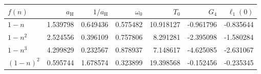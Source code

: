 \begin{tabular}{lrrrrrr}
\toprule
$f(n)$ & $a_{\mathrm{H}}$ & $1/a_{\mathrm{H}}$ & $\omega_0$ & $T_0$ & $G_4$ & $\ell_1(0)$ \\
\midrule
$1-n$ & 1.539798 & 0.649436 & 0.575482 & 10.918127 & -0.961796 & -0.835644 \\
$1-n^2$ & 2.524556 & 0.396109 & 0.757806 & 8.291281 & -2.395098 & -1.580284 \\
$1-n^3$ & 4.299829 & 0.232567 & 0.878937 & 7.148617 & -4.625085 & -2.631067 \\
$(1-n)^2$ & 0.595744 & 1.678574 & 0.323899 & 19.398568 & -0.152456 & -0.235345 \\
\bottomrule
\end{tabular}
